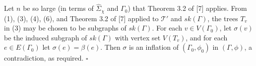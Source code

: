 Let $n$ be so large (in terms of $\hat{\Sigma}_\chi$ and $\Gamma_0$) that Theorem 3.2 of [7] applies. From (1), (3), (4), (6), and Theorem 3.2 of [7] applied to $\mathscr{T}'$ and $sk(\Gamma)$, the trees $T_v$ in (3) may be chosen to be subgraphs of $sk(\Gamma)$. For each $v \in V(\Gamma_0)$, let $\sigma(v)$ be the induced subgraph of $sk(\Gamma)$ with vertex set $V(T_v)$, and for each $e \in E(\Gamma_0)$ let $\sigma(e) = \beta(e)$. Then $\sigma$ is an inflation of $(\Gamma_0, \phi_0)$ in $(\Gamma, \phi)$, a contradiction, as required. $\square$
